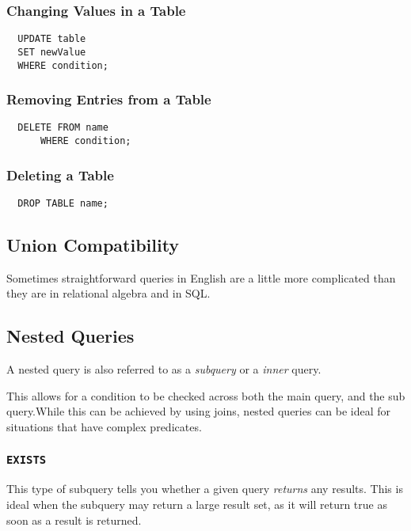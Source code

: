 \documentclass{article}
\begin{document}
\subsubsection{Changing Values in a Table}

\begin{lstlisting}
  UPDATE table
  SET newValue
  WHERE condition;
\end{lstlisting}

\subsubsection{Removing Entries from a Table}

\begin{lstlisting}
  DELETE FROM name
      WHERE condition;
\end{lstlisting}

\subsubsection{Deleting a Table}

\begin{lstlisting}
  DROP TABLE name;
\end{lstlisting}



\subsection{Union Compatibility}

Sometimes straightforward queries in English are a little more complicated than they are in relational algebra and in SQL. 

\subsection{Nested Queries}

A nested query is also referred to as a \textit{subquery} or a \textit{inner} query.

This allows for a condition to be checked across both the main query, and the sub query.While this can be achieved by using joins, nested queries can be ideal for situations that have complex predicates.

\subsubsection{\texttt{EXISTS}}

This type of subquery tells you whether a given query \textit{returns} any results. This is ideal when the subquery may return a large result set, as it will return true as soon as a result is returned.
\end{document}
